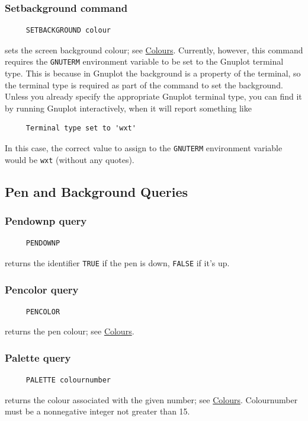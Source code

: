 \subsubsection*{Setbackground command}
\begin{verbatim}
     SETBACKGROUND colour
\end{verbatim}
sets the screen background colour; see
\hyperref[logoturtle:Colours]{Colours}.  Currently, however, this
command requires the \texttt{GNUTERM} environment variable to be set
to the Gnuplot terminal type.  This is because in Gnuplot the
background is a property of the terminal, so the terminal type is
required as part of the command to set the background.  Unless you
already specify the appropriate Gnuplot terminal type, you can find it
by running Gnuplot interactively, when it will report something like
\begin{verbatim}
     Terminal type set to 'wxt'
\end{verbatim}
In this case, the correct value to assign to the \texttt{GNUTERM}
environment variable would be \texttt{wxt} (without any quotes).


\subsection{Pen and Background Queries}

\subsubsection*{Pendownp query}
\begin{verbatim}
     PENDOWNP
\end{verbatim}
returns the identifier \texttt{TRUE} if the pen is down,
\texttt{FALSE} if it's up.

\subsubsection*{Pencolor query}
\begin{verbatim}
     PENCOLOR
\end{verbatim}
\label{logoturtle:pencolor}
returns the pen colour; see \hyperref[logoturtle:Colours]{Colours}.

\subsubsection*{Palette query}
\begin{verbatim}
     PALETTE colournumber
\end{verbatim}
returns the colour associated with the given number; see
\hyperref[logoturtle:Colours]{Colours}.  Colournumber must be a
nonnegative integer not greater than 15.

